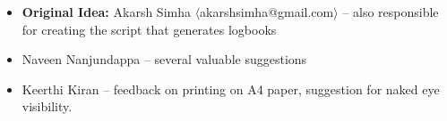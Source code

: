\begin{itemize}
\item \textbf{Original Idea:} Akarsh Simha
  $\langle$akarshsimha@gmail.com$\rangle$ -- also responsible for
  creating the script that generates logbooks
\item Naveen Nanjundappa -- several valuable suggestions
\item Keerthi Kiran -- feedback on printing on A4 paper, suggestion
  for naked eye visibility.
\end{itemize}
